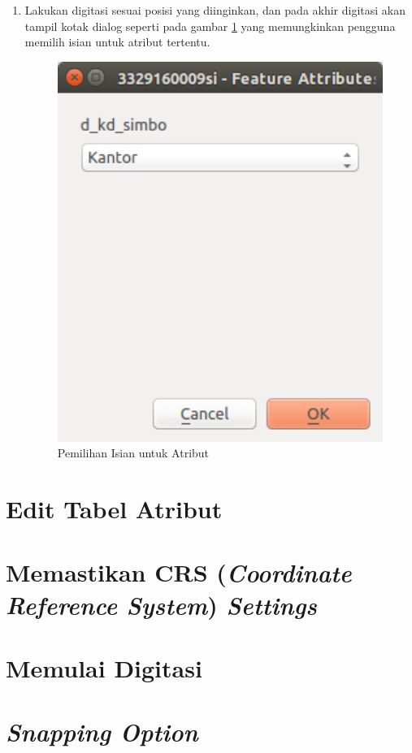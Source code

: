 \begin{enumerate}[1.]
  \item Lakukan digitasi sesuai posisi yang diinginkan, dan pada akhir digitasi akan tampil kotak dialog seperti pada gambar \ref{fig:pilihanatribut} yang memungkinkan pengguna memilih isian untuk atribut tertentu.
  
  \begin{figure}[H]
    \centering
    \includegraphics[width=1\textwidth]{./resources/041-pilihan-atribut}
    \caption{Pemilihan Isian untuk Atribut}
    \label{fig:pilihanatribut}
  \end{figure}
  
\end{enumerate}

\section{Edit Tabel Atribut}

\section{Memastikan CRS (\textit{Coordinate Reference System}) \textit{Settings}}

\section{Memulai Digitasi}

\section{\textit{Snapping Option}}